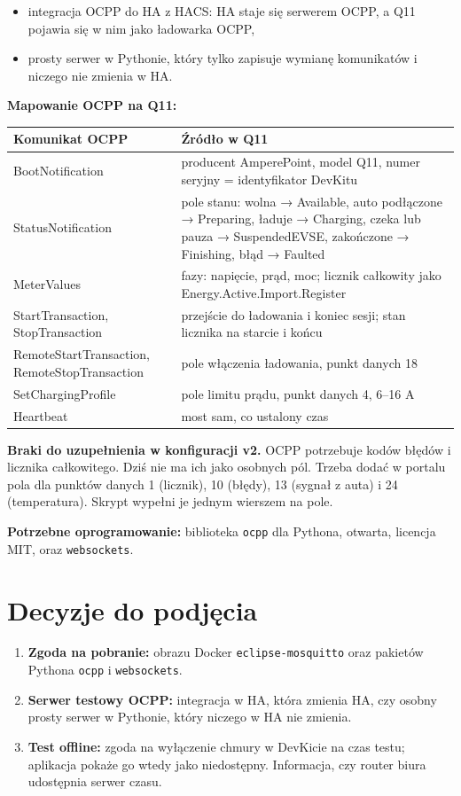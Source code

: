 \documentclass[11pt,a4paper]{article}
\begin{document}
\begin{itemize}
\item integracja OCPP do HA z HACS: HA staje się serwerem OCPP, a Q11 pojawia się w nim jako ładowarka OCPP,
\item prosty serwer w Pythonie, który tylko zapisuje wymianę komunikatów i niczego nie zmienia w HA.
\end{itemize}

\textbf{Mapowanie OCPP na Q11:}


\begin{longtable}{>{\raggedright\arraybackslash}p{4.27cm}>{\raggedright\arraybackslash}p{11.45cm}}
\toprule
\rowcolor{apteallight}\textbf{Komunikat OCPP} & \textbf{Źródło w Q11} \\
\midrule\endhead
\bottomrule\endfoot
BootNotification & producent AmperePoint, model Q11, numer seryjny = identyfikator DevKitu \\
StatusNotification & pole stanu: wolna {\symbolfont→} Available, auto podłączone {\symbolfont→} Preparing, ładuje {\symbolfont→} Charging, czeka lub pauza {\symbolfont→} SuspendedEVSE, zakończone {\symbolfont→} Finishing, błąd {\symbolfont→} Faulted \\
MeterValues & fazy: napięcie, prąd, moc; licznik całkowity jako Energy.Active.Import.Register \\
StartTransaction, StopTransaction & przejście do ładowania i koniec sesji; stan licznika na starcie i końcu \\
RemoteStartTransaction, RemoteStopTransaction & pole włączenia ładowania, punkt danych 18 \\
SetChargingProfile & pole limitu prądu, punkt danych 4, 6–16 A \\
Heartbeat & most sam, co ustalony czas \\
\end{longtable}

\textbf{Braki do uzupełnienia w konfiguracji v2.} OCPP potrzebuje kodów błędów i licznika całkowitego. Dziś nie ma ich jako osobnych pól. Trzeba dodać w portalu pola dla punktów danych 1 (licznik), 10 (błędy), 13 (sygnał z auta) i 24 (temperatura). Skrypt wypełni je jednym wierszem na pole.


\textbf{Potrzebne oprogramowanie:} biblioteka \texttt{ocpp} dla Pythona, otwarta, licencja MIT, oraz \texttt{websockets}.


\section{Decyzje do podjęcia}

\begin{enumerate}
\item \textbf{Zgoda na pobranie:} obrazu Docker \texttt{eclipse-\allowbreak{}mosquitto} oraz pakietów Pythona \texttt{ocpp} i \texttt{websockets}.
\item \textbf{Serwer testowy OCPP:} integracja w HA, która zmienia HA, czy osobny prosty serwer w Pythonie, który niczego w HA nie zmienia.
\item \textbf{Test offline:} zgoda na wyłączenie chmury w DevKicie na czas testu; aplikacja pokaże go wtedy jako niedostępny. Informacja, czy router biura udostępnia serwer czasu.
\end{enumerate}
\end{document}
